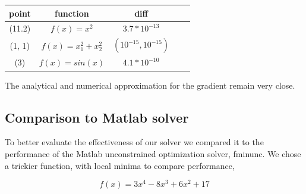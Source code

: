 \documentclass[10pt,twocolumn]{article}
\begin{document}
\begin{center}
  \begin{tabular}{ | c | c | c | c | c | }
    \hline
     point & function  & diff \\ \hline
     (11.2) & $f(x) = x^2$ & $3.7*10^{-13}$ \\ \hline
     (1, 1) & $f(x) = x_1^2+ x_2^2$ & $(10^{-15}, 10^{-15})$ \\ \hline
     (3) & $f(x) = sin(x)$ & $4.1*10^{-10}$ \\ 
    \hline
  \end{tabular}
\end{center}

The analytical and numerical approximation for the gradient remain very close.

\subsection*{Comparison to Matlab solver}

To better evaluate the effectiveness of our solver we compared it to the performance of the Matlab unconstrained optimization solver, fminunc. We chose a trickier function, with local minima to compare performance, 

\begin{equation}
f(x)= 3x^4-8x^3+6x^2+17
\end{equation}
\end{document}
